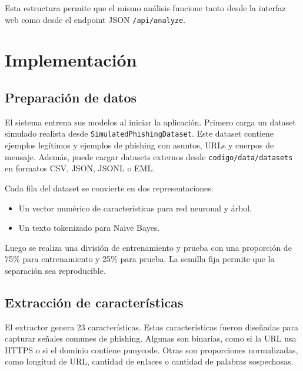 \documentclass[12pt,letterpaper]{article}
\begin{document}
Esta estructura permite que el mismo análisis funcione tanto desde la interfaz web como desde el endpoint JSON \texttt{/api/analyze}.

\section{Implementación}

\subsection{Preparación de datos}

El sistema entrena sus modelos al iniciar la aplicación. Primero carga un dataset simulado realista desde \texttt{SimulatedPhishingDataset}. Este dataset contiene ejemplos legítimos y ejemplos de phishing con asuntos, URLs y cuerpos de mensaje. Además, puede cargar datasets externos desde \texttt{codigo/data/datasets} en formatos CSV, JSON, JSONL o EML.

Cada fila del dataset se convierte en dos representaciones:

\begin{itemize}
    \item Un vector numérico de características para red neuronal y árbol.
    \item Un texto tokenizado para Naive Bayes.
\end{itemize}

Luego se realiza una división de entrenamiento y prueba con una proporción de 75\% para entrenamiento y 25\% para prueba. La semilla fija permite que la separación sea reproducible.

\subsection{Extracción de características}

El extractor genera 23 características. Estas características fueron diseñadas para capturar señales comunes de phishing. Algunas son binarias, como si la URL usa HTTPS o si el dominio contiene punycode. Otras son proporciones normalizadas, como longitud de URL, cantidad de enlaces o cantidad de palabras sospechosas.
\end{document}
